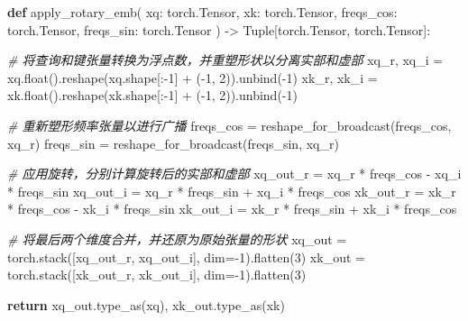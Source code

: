 \documentclass[
]{article}
\newenvironment{Shaded}{}{}
\newcommand{\BuiltInTok}[1]{\textcolor[rgb]{0.00,0.50,0.00}{#1}}
\newcommand{\CommentTok}[1]{\textcolor[rgb]{0.38,0.63,0.69}{\textit{#1}}}
\newcommand{\ControlFlowTok}[1]{\textcolor[rgb]{0.00,0.44,0.13}{\textbf{#1}}}
\newcommand{\DecValTok}[1]{\textcolor[rgb]{0.25,0.63,0.44}{#1}}
\newcommand{\KeywordTok}[1]{\textcolor[rgb]{0.00,0.44,0.13}{\textbf{#1}}}
\newcommand{\NormalTok}[1]{#1}
\newcommand{\OperatorTok}[1]{\textcolor[rgb]{0.40,0.40,0.40}{#1}}
\begin{document}
\begin{Shaded}
\begin{Highlighting}[]
\KeywordTok{def}\NormalTok{ apply\_rotary\_emb(}
\NormalTok{    xq: torch.Tensor,}
\NormalTok{    xk: torch.Tensor,}
\NormalTok{    freqs\_cos: torch.Tensor,}
\NormalTok{    freqs\_sin: torch.Tensor}
\NormalTok{) }\OperatorTok{{-}\textgreater{}}\NormalTok{ Tuple[torch.Tensor, torch.Tensor]:}

    \CommentTok{\# 将查询和键张量转换为浮点数，并重塑形状以分离实部和虚部}
\NormalTok{    xq\_r, xq\_i }\OperatorTok{=}\NormalTok{ xq.}\BuiltInTok{float}\NormalTok{().reshape(xq.shape[:}\OperatorTok{{-}}\DecValTok{1}\NormalTok{] }\OperatorTok{+}\NormalTok{ (}\OperatorTok{{-}}\DecValTok{1}\NormalTok{, }\DecValTok{2}\NormalTok{)).unbind(}\OperatorTok{{-}}\DecValTok{1}\NormalTok{)}
\NormalTok{    xk\_r, xk\_i }\OperatorTok{=}\NormalTok{ xk.}\BuiltInTok{float}\NormalTok{().reshape(xk.shape[:}\OperatorTok{{-}}\DecValTok{1}\NormalTok{] }\OperatorTok{+}\NormalTok{ (}\OperatorTok{{-}}\DecValTok{1}\NormalTok{, }\DecValTok{2}\NormalTok{)).unbind(}\OperatorTok{{-}}\DecValTok{1}\NormalTok{)}

    \CommentTok{\# 重新塑形频率张量以进行广播}
\NormalTok{    freqs\_cos }\OperatorTok{=}\NormalTok{ reshape\_for\_broadcast(freqs\_cos, xq\_r)}
\NormalTok{    freqs\_sin }\OperatorTok{=}\NormalTok{ reshape\_for\_broadcast(freqs\_sin, xq\_r)}

    \CommentTok{\# 应用旋转，分别计算旋转后的实部和虚部}
\NormalTok{    xq\_out\_r }\OperatorTok{=}\NormalTok{ xq\_r }\OperatorTok{*}\NormalTok{ freqs\_cos }\OperatorTok{{-}}\NormalTok{ xq\_i }\OperatorTok{*}\NormalTok{ freqs\_sin}
\NormalTok{    xq\_out\_i }\OperatorTok{=}\NormalTok{ xq\_r }\OperatorTok{*}\NormalTok{ freqs\_sin }\OperatorTok{+}\NormalTok{ xq\_i }\OperatorTok{*}\NormalTok{ freqs\_cos}
\NormalTok{    xk\_out\_r }\OperatorTok{=}\NormalTok{ xk\_r }\OperatorTok{*}\NormalTok{ freqs\_cos }\OperatorTok{{-}}\NormalTok{ xk\_i }\OperatorTok{*}\NormalTok{ freqs\_sin}
\NormalTok{    xk\_out\_i }\OperatorTok{=}\NormalTok{ xk\_r }\OperatorTok{*}\NormalTok{ freqs\_sin }\OperatorTok{+}\NormalTok{ xk\_i }\OperatorTok{*}\NormalTok{ freqs\_cos}

    \CommentTok{\# 将最后两个维度合并，并还原为原始张量的形状}
\NormalTok{    xq\_out }\OperatorTok{=}\NormalTok{ torch.stack([xq\_out\_r, xq\_out\_i], dim}\OperatorTok{={-}}\DecValTok{1}\NormalTok{).flatten(}\DecValTok{3}\NormalTok{)}
\NormalTok{    xk\_out }\OperatorTok{=}\NormalTok{ torch.stack([xk\_out\_r, xk\_out\_i], dim}\OperatorTok{={-}}\DecValTok{1}\NormalTok{).flatten(}\DecValTok{3}\NormalTok{)}

    \ControlFlowTok{return}\NormalTok{ xq\_out.type\_as(xq), xk\_out.type\_as(xk)}
\end{Highlighting}
\end{Shaded}
\end{document}
